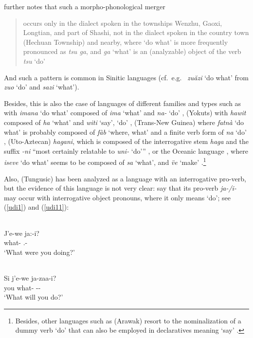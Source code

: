 \documentclass[output=paper]{langsci/langscibook}
\begin{document}
\citet[170, 5n. 7]{luo2016} further notes that such a morpho-phonological
merger \blockquote{occurs only in the dialect spoken in the townships Wenzhu,
    Gaoxi, Longtian, and part of Shashi, not in the dialect spoken in the
    country town (Hechuan Township) and nearby, where `do what' is more
frequently pronounced as \emph{tsu ga}, and \emph{ga} `what' is an (analyzable)
object of the verb \emph{tsu} `do'}. And such a pattern is common in Sinitic
languages (cf.\ e.g.\  \emph{zu\u azi} `do what' from
\emph{zuo} `do' and \emph{sazi} `what').

Besides, this is also the case of languages of different families and types
such as  with \emph{imana} `do what' composed of \emph{ima}
`what' and \emph{na-} `do' \citep{weber1989},   (Yokuts) with
\emph{hawit} composed of \emph{ha} `what' and \emph{witi} `say', `do'
\citep{gamble1978},  (Trans-New Guinea) where \emph{fatn\`a} `do what' is
probably composed of \emph{f\`ab} `where, what' and a finite verb form of
\emph{na} `do' \citep[see][]{fedden2011},  (Uto-Aztecan)
\emph{hagani}, which is composed of the interrogative stem \emph{haga} and the
suffix \emph{-ni} ``most certainly relatable to \emph{uni-} `do'{''}
\citep[89]{press1979}, or the Oceanic language , where \emph{iseve} `do
what' seems to be composed of \emph{sa} `what', and \emph{\"ve} `make'
\citep[312, fn. 46]{guerin2011}.\footnote{Besides, other languages such as
 (Arawak) resort to the nominalization of a dummy verb `do' that can also
be employed in declaratives meaning `say' \citep{danielsen2007}.}

Also,  (Tungusic) has been analyzed as a language with an
interrogative pro-verb, but the evidence of this language is not very clear:
\citet[352--353, 802]{nikolaeva.tolskaya2001} say that its pro-verb
\emph{ja-/i-} may occur with interrogative object pronouns, where it only means
`do'; see (\ref{udi1}) and (\ref{udi11}):

\begin{exe}
\ex \label{udi1} \\
\gll J'e-we ja:-i?\\
what-\Acc{} \Prov{}.\Pst-\Ssg{}\\
\glt `What were you doing?'

\ex \label{udi11} \\
\gll Si j'e-we ja-za\ng a-i?\\
you what-\Acc{} \Prov{}-\Fut{}-\Ssg{}\\
\glt `What will you do?'
\end{exe}
\end{document}
